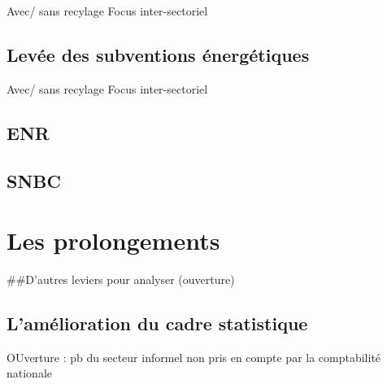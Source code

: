 \documentclass[
]{article}
\begin{document}
Avec/ sans recylage Focus inter-sectoriel

\hypertarget{levuxe9e-des-subventions-uxe9nerguxe9tiques}{%
\subsection{Levée des subventions
énergétiques}\label{levuxe9e-des-subventions-uxe9nerguxe9tiques}}

Avec/ sans recylage Focus inter-sectoriel

\hypertarget{enr}{%
\subsection{ENR}\label{enr}}

\hypertarget{snbc}{%
\subsection{SNBC}\label{snbc}}

\hypertarget{les-prolongements}{%
\section{Les prolongements}\label{les-prolongements}}

\#\#D'autres leviers pour analyser (ouverture)

\hypertarget{lamuxe9lioration-du-cadre-statistique}{%
\subsection{L'amélioration du cadre
statistique}\label{lamuxe9lioration-du-cadre-statistique}}

OUverture : pb du secteur informel non pris en compte par la
comptabilité nationale

\printbibliography[title=Conclusion]
\end{document}
